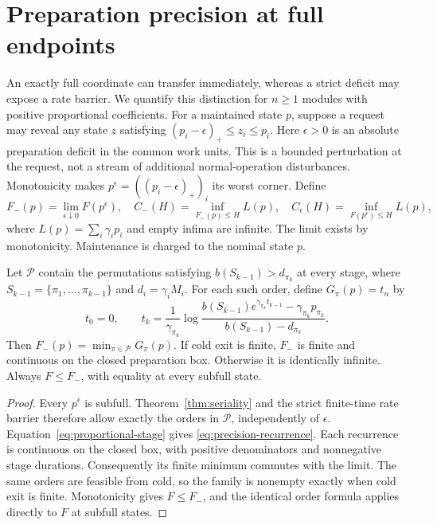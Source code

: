 \section{Preparation precision at full endpoints}
\label{sec:precision}

An exactly full coordinate can transfer immediately, whereas a strict
deficit may expose a rate barrier. We quantify this distinction for
$n\geq1$ modules with positive proportional coefficients. For a maintained
state $p$, suppose a request may reveal any state $z$ satisfying
$(p_i-\epsilon)_+\leq z_i\leq p_i$. Here $\epsilon>0$ is an absolute
preparation deficit in the common work units. This is a bounded perturbation
at the request, not a stream of additional normal-operation disturbances.
Monotonicity makes $p^\epsilon=((p_i-\epsilon)_+)_i$ its worst corner.
Define
\begin{equation}
 F_-(p)=\lim_{\epsilon\downarrow0}F(p^\epsilon),\quad
 C_-(H)=\inf_{F_-(p)\leq H}L(p),\quad
 C_\epsilon(H)=\inf_{F(p^\epsilon)\leq H}L(p),
 \label{eq:precision-costs}
\end{equation}
where $L(p)=\sum_i\gamma_i p_i$ and empty infima are infinite. The limit
exists by monotonicity. Maintenance is charged to the nominal state $p$.

\begin{proposition}
\label{prop:precision-oracle}
Let $\mathcal P$ contain the permutations satisfying
$b(S_{k-1})>d_{\pi_k}$ at every stage, where
$S_{k-1}=\{\pi_1,\ldots,\pi_{k-1}\}$ and $d_i=\gamma_iM_i$.
For each such order, define $G_\pi(p)=t_n$ by
\begin{equation}
 t_0=0,\qquad
 t_k=\frac1{\gamma_{\pi_k}}
 \log\frac{b(S_{k-1})e^{\gamma_{\pi_k}t_{k-1}}
                  -\gamma_{\pi_k}p_{\pi_k}}
                 {b(S_{k-1})-d_{\pi_k}}.
 \label{eq:precision-recurrence}
\end{equation}
Then $F_-(p)=\min_{\pi\in\mathcal P}G_\pi(p)$.
If cold exit is finite, $F_-$ is finite and continuous on the closed
preparation box. Otherwise it is identically infinite.
Always $F\leq F_-$, with equality at every subfull state.
\end{proposition}

\begin{proof}
Every $p^\epsilon$ is subfull. Theorem~\ref{thm:seriality} and the
strict finite-time rate barrier therefore allow exactly the orders in
$\mathcal P$, independently of $\epsilon$. Equation~\eqref{eq:proportional-stage}
gives \eqref{eq:precision-recurrence}. Each recurrence is continuous on the
closed box, with positive denominators and nonnegative stage durations.
Consequently its finite minimum commutes with the limit. The same orders
are feasible from cold, so the family is nonempty exactly when cold exit
is finite. Monotonicity gives $F\leq F_-$, and the identical order formula
applies directly to $F$ at subfull states.
\end{proof}

